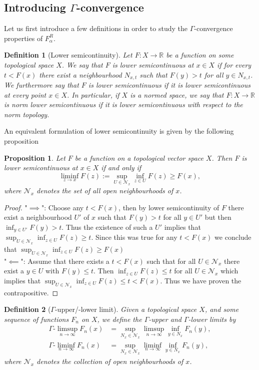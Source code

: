 \documentclass[a4paper,11pt]{article}
\newcommand{\R}{\mathbb{R}}
\newcommand{\Gliminf}{\Gamma\text{-}\liminf}
\newcommand{\Glimsup}{\Gamma\text{-}\limsup}
\newtheorem{definition}{Definition}
\newtheorem{proposition}{Proposition}
\numberwithin{equation}{section}
\begin{document}
\subsection{Introducing $ \Gamma $-convergence}
Let us first introduce a few definitions in order to study the $ \Gamma $-convergence properties of $ F_\alpha^R $.
\begin{definition}[Lower semicontinuity]
	Let $ F:X\to\R $ be a function on some topological space $ X $. We say that $ F $ is lower semicontinuous at $ x\in X $ if for every $ t<F(x) $ there exist a neighbourhood $ N_{x,t} $ such that $ F(y)>t $ for all $ y\in N_{x,t} $. We furthermore say that $ F $ is lower semicontinuous if it is lower semicontinuous at every point $ x\in X $.  In particular, if $ X $ is a normed space, we say that $ F:X\to\R $ is norm lower semicontinuous if it is lower semicontinuous with respect to the norm topology. 
\end{definition}
An equivalent formulation of lower semicontinuity is given by the following proposition
\begin{proposition}\label{Lower semicont prop}
	Let $ F $ be a function on a topological vector space $ X $. Then $ F $ is lower semicontinuous at $ x\in X $ if and only if \begin{equation}
	\liminf_{z\to x}F(z):=\sup_{U\in\mathcal{N}_x}\inf_{z\in U}F(z)\geq F(x),
	\end{equation}
	where $ \mathcal{N}_x $ denotes the set of all open neighbourhoods of $ x $.
\end{proposition}
\begin{proof}
	"$ \implies $": Choose any $ t<F(x) $, then by lower semicontinuity of $ F $ there exist a neighbourhood $ U' $ of $ x $ such that $ F(y)>t $ for all $ y\in U' $ but then $ \inf_{y\in U'}F(y)>t $. Thus the existence of such a $ U' $ implies that $ \sup_{U\in\mathcal{N}_x}\inf_{z\in U}F(z)\geq t $. Since this was true for any $ t<F(x) $ we conclude that $ \sup_{U\in\mathcal{N}_x}\inf_{z\in U}F(z)\geq F(x) $\\
	"$ \impliedby $": Assume that there exists a $ t<F(x) $ such that for all $ U\in\mathcal{N}_x $ there exist a $ y\in U $ with $ F(y)\leq t $. Then $ \inf_{z\in U} F(z)\leq t $ for all $ U\in\mathcal{N}_x $ which implies that $ \sup_{U\in\mathcal{N}_x}\inf_{z\in U}F(z)\leq t<F(x) $. Thus we have proven the contrapositive.
\end{proof}
\begin{definition}[$ \Gamma $-upper/-lower limit]
	Given a topological space $ X $, and some sequence of functions $ F_n $ on $ X $, we define the $ \Gamma $-upper and $ \Gamma $-lower limits by \begin{equation}
	\begin{aligned}
	\Glimsup_{n\to\infty}F_n(x)&=\sup_{N_x\in\mathcal{N}_x}\limsup_{n\to\infty}\inf_{y\in N_x}F_n(y),\\
	\Gliminf_{n\to\infty}F_n(x)&=\sup_{N_x\in\mathcal{N}_x}\liminf_{n\to\infty}\inf_{y\in N_x}F_n(y),
	\end{aligned}
	\end{equation}
	where $ \mathcal{N}_x $ denotes the collection of open neighbourhoods of $ x $.
\end{definition}
\end{document}

